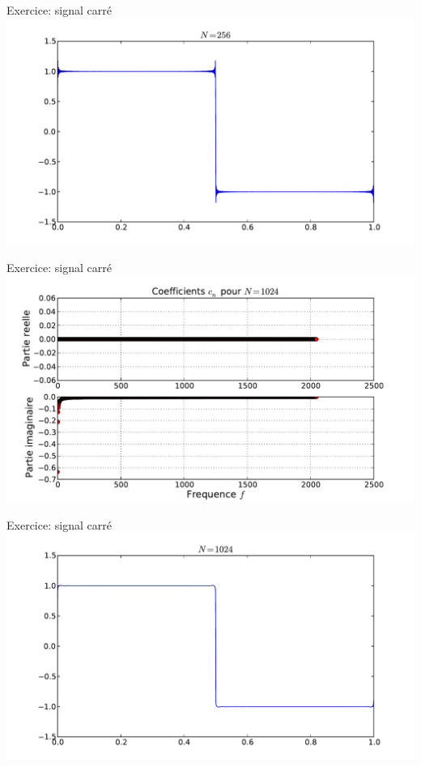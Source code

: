 \documentclass[8pt,a4paper]{beamer}
\begin{document}
\begin{frame}{Exercice: signal carré}
\includegraphics[width=1.\textwidth]{figures/serieF_carre_256.pdf}\\
\end{frame}

\begin{frame}{Exercice: signal carré}
\includegraphics[width=1.\textwidth]{figures/serieF_carre_c_1024.pdf} \\
\end{frame}

\begin{frame}{Exercice: signal carré}
\includegraphics[width=1.\textwidth]{figures/serieF_carre_1024.pdf}\\
\end{frame}
\end{document}
